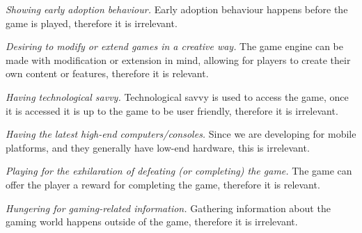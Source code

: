 \emph{Showing early adoption behaviour.}
Early adoption behaviour happens before the game is played, therefore it is irrelevant.

\emph{Desiring to modify or extend games in a creative way.}
The game engine can be made with modification or extension in mind, allowing for players to create their own content or features, therefore it is relevant.

\emph{Having technological savvy.}
Technological savvy is used to access the game, once it is accessed it is up to the game to be user friendly, therefore it is irrelevant.

\emph{Having the latest high-end computers/consoles.}
Since we are developing for mobile platforms, and they generally have low-end hardware, this is irrelevant.

\emph{Playing for the exhilaration of defeating (or completing) the game.}
The game can offer the player a reward for completing the game, therefore it is relevant.

\emph{Hungering for gaming-related information.}
Gathering information about the gaming world happens outside of the game, therefore it is irrelevant.


